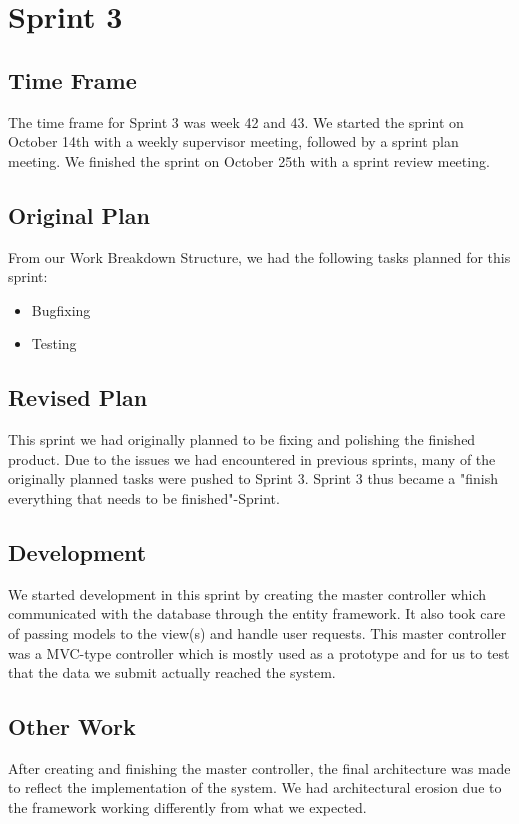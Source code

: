 \section{Sprint 3}

\subsection{Time Frame}
The time frame for Sprint 3 was week 42 and 43. We started the sprint on October 14th with a weekly supervisor meeting, followed by a sprint plan meeting. We finished the sprint on October 25th with a sprint review meeting.

\subsection{Original Plan}
From our Work Breakdown Structure, we had the following tasks planned for this sprint:
\begin{itemize}
	\item Bugfixing
	\item Testing
\end{itemize}

\subsection{Revised Plan}
This sprint we had originally planned to be fixing and polishing the finished product. Due to the issues we had encountered in previous sprints, many of the originally planned tasks were pushed to Sprint 3. Sprint 3 thus became a "finish everything that needs to be finished"-Sprint.

\subsection{Development}
We started development in this sprint by creating the master controller which communicated with the database through the entity framework. It also took care of passing models to the view(s) and handle user requests. This master controller was a MVC-type controller which is mostly used as a prototype and for us to test that the data we submit actually reached the system.

\subsection{Other Work}
After creating and finishing the master controller, the final architecture was made to reflect the implementation of the system. We had architectural erosion due to the framework working differently from what we expected.

